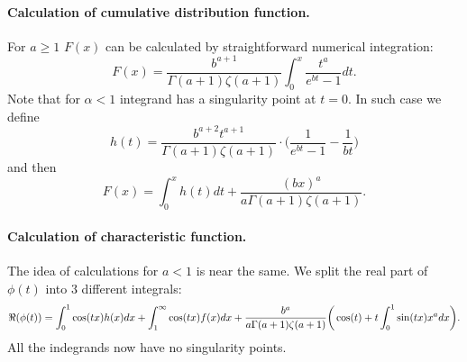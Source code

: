 \documentclass[a4paper,11pt]{article}
\theoremstyle{plain}
\theoremstyle{definition}
\begin{document}
    \paragraph{Calculation of cumulative distribution function.} For $a \geq 1$ $F(x)$ can be calculated by straightforward numerical integration:
    \[
    F(x) = \frac{b^{a+1}}{\Gamma(a+1)\zeta(a+1)} \int_{0}^{x} \frac{t ^ a}{e^{bt} - 1} dt.
    \]
    Note that for $\alpha < 1$ integrand has a singularity point at $t=0$. In such case we define
    \[
    h(t) = \frac{b^{a+2}t ^ {a+1} }{\Gamma(a+1)\zeta(a+1)} \cdot \bigg( \frac{1}{e^{bt} -  1}-\frac{1}{bt}\bigg)
    \]
    and then
    \[
    F(x) = \int_{0}^{x}  h(t) dt + \frac{(bx)^{a}}{a\Gamma(a+1)\zeta(a+1)}.
    \]
	
	\paragraph{Calculation of characteristic function.} The idea of calculations for $a < 1$ is near the same. We split the real part of $\phi(t)$ into $3$ different integrals:
	\[
	\Re(\phi(t)) = \int_{0}^{1} \cos(tx) h(x) dx + \int_{1}^{\infty} \cos(tx) f(x{\tiny }) dx + \frac{b^{a}}{a\Gamma(a+1)\zeta(a+1)} \bigg(\cos(t) + t\int_{0}^{1} \sin(tx)x^a dx \bigg).
	\]
	All the indegrands now have no singularity points.
	
	\pagebreak
\end{document}
